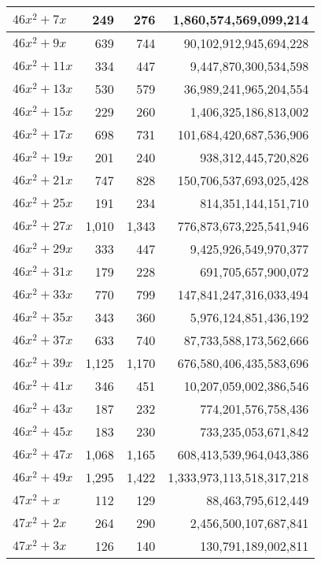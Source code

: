 \documentclass[a4paper]{amsproc}
\theoremstyle{plain}
\begin{document}
\begin{longtable}{ | l | r | r | r | }
$46x^2 + 7x$ & 249 & 276 & 1{,}860{,}574{,}569{,}099{,}214 \\ \hline
$46x^2 + 9x$ & 639 & 744 & 90{,}102{,}912{,}945{,}694{,}228 \\ \hline
$46x^2 + 11x$ & 334 & 447 & 9{,}447{,}870{,}300{,}534{,}598 \\ \hline
$46x^2 + 13x$ & 530 & 579 & 36{,}989{,}241{,}965{,}204{,}554 \\ \hline
$46x^2 + 15x$ & 229 & 260 & 1{,}406{,}325{,}186{,}813{,}002 \\ \hline
$46x^2 + 17x$ & 698 & 731 & 101{,}684{,}420{,}687{,}536{,}906 \\ \hline
$46x^2 + 19x$ & 201 & 240 & 938{,}312{,}445{,}720{,}826 \\ \hline
$46x^2 + 21x$ & 747 & 828 & 150{,}706{,}537{,}693{,}025{,}428 \\ \hline
$46x^2 + 25x$ & 191 & 234 & 814{,}351{,}144{,}151{,}710 \\ \hline
$46x^2 + 27x$ & 1{,}010 & 1{,}343 & 776{,}873{,}673{,}225{,}541{,}946 \\ \hline
$46x^2 + 29x$ & 333 & 447 & 9{,}425{,}926{,}549{,}970{,}377 \\ \hline
$46x^2 + 31x$ & 179 & 228 & 691{,}705{,}657{,}900{,}072 \\ \hline
$46x^2 + 33x$ & 770 & 799 & 147{,}841{,}247{,}316{,}033{,}494 \\ \hline
$46x^2 + 35x$ & 343 & 360 & 5{,}976{,}124{,}851{,}436{,}192 \\ \hline
$46x^2 + 37x$ & 633 & 740 & 87{,}733{,}588{,}173{,}562{,}666 \\ \hline
$46x^2 + 39x$ & 1{,}125 & 1{,}170 & 676{,}580{,}406{,}435{,}583{,}696 \\ \hline
$46x^2 + 41x$ & 346 & 451 & 10{,}207{,}059{,}002{,}386{,}546 \\ \hline
$46x^2 + 43x$ & 187 & 232 & 774{,}201{,}576{,}758{,}436 \\ \hline
$46x^2 + 45x$ & 183 & 230 & 733{,}235{,}053{,}671{,}842 \\ \hline
$46x^2 + 47x$ & 1{,}068 & 1{,}165 & 608{,}413{,}539{,}964{,}043{,}386 \\ \hline
$46x^2 + 49x$ & 1{,}295 & 1{,}422 & 1{,}333{,}973{,}113{,}518{,}317{,}218 \\ \hline
$47x^2 + x$ & 112 & 129 & 88{,}463{,}795{,}612{,}449 \\ \hline
$47x^2 + 2x$ & 264 & 290 & 2{,}456{,}500{,}107{,}687{,}841 \\ \hline
$47x^2 + 3x$ & 126 & 140 & 130{,}791{,}189{,}002{,}811 \\ \hline

\end{longtable}
\end{document}
